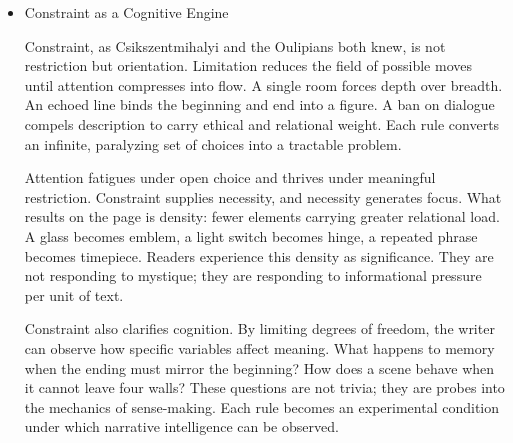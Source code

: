 \documentclass[11pt]{article}
\begin{document}
\begin{itemize}
This is why the curriculum begins with an object, a room, and a rule. These are not decorative choices. They are the fastest way to force a chronotope into being. An object stabilizes reference. A room constrains movement and sightlines. A rule establishes the social gravity that governs behavior within the room. Together they create the first conditions of coherence: what can happen, how quickly, and what it means when it does.

Chronotopes also scale inward. Thought is often staged spatially: a memory “opens a door,” an idea “sits in the corner,” an emotion “fills the air.” Writers reach for these metaphors not because they are picturesque but because cognition requires them. There is no thinking outside of forms that organize time and space. To choose a chronotope is to choose a mode of attention. The memoir that begins in a kitchen will think differently than the memoir that begins on a ferry. The difference is not trivial; it determines which causal connections feel natural, which motives seem plausible, and which silences are legible.

The discipline of Act I is therefore architectural. The goal is to build a stable environment that can bear the weight of subsequent destabilization. Without that architecture, fracture later will read as noise. With it, fracture can reveal latent structure.
\item Constraint as a Cognitive Engine
\label{sec:org2a208f2}

Constraint, as Csikszentmihalyi and the Oulipians both knew, is not restriction but orientation. Limitation reduces the field of possible moves until attention compresses into flow. A single room forces depth over breadth. An echoed line binds the beginning and end into a figure. A ban on dialogue compels description to carry ethical and relational weight. Each rule converts an infinite, paralyzing set of choices into a tractable problem.

Attention fatigues under open choice and thrives under meaningful restriction. Constraint supplies necessity, and necessity generates focus. What results on the page is density: fewer elements carrying greater relational load. A glass becomes emblem, a light switch becomes hinge, a repeated phrase becomes timepiece. Readers experience this density as significance. They are not responding to mystique; they are responding to informational pressure per unit of text.

Constraint also clarifies cognition. By limiting degrees of freedom, the writer can observe how specific variables affect meaning. What happens to memory when the ending must mirror the beginning? How does a scene behave when it cannot leave four walls? These questions are not trivia; they are probes into the mechanics of sense-making. Each rule becomes an experimental condition under which narrative intelligence can be observed.


\end{itemize}
\end{document}
